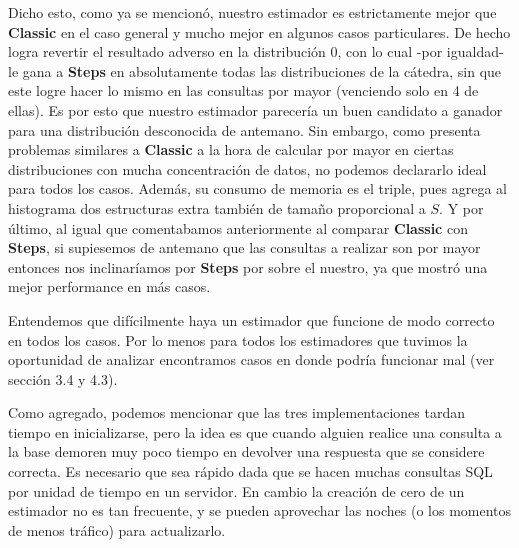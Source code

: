 Dicho esto, como ya se mencionó, nuestro estimador es estrictamente mejor que \textbf{Classic} en el caso general y mucho mejor en algunos casos particulares. De hecho logra revertir el resultado adverso en la distribución 0, con lo cual -por igualdad- le gana a \textbf{Steps} en absolutamente todas las distribuciones de la cátedra, sin que este logre hacer lo mismo en las consultas por mayor (venciendo solo en 4 de ellas). Es por esto que nuestro estimador parecería un buen candidato a ganador para una distribución desconocida de antemano. Sin embargo, como presenta problemas similares a \textbf{Classic} a la hora de calcular por mayor en ciertas distribuciones con mucha concentración de datos, no podemos declararlo ideal para todos los casos. Además, su consumo de memoria es el triple, pues agrega al histograma dos estructuras extra también de tamaño proporcional a $S$. Y por último, al igual que comentabamos anteriormente al comparar \textbf{Classic} con \textbf{Steps}, si supiesemos de antemano que las consultas a realizar son por mayor entonces nos inclinaríamos por \textbf{Steps} por sobre el nuestro, ya que mostró una mejor performance en más casos.

Entendemos que difícilmente haya un estimador que funcione de modo correcto en todos los casos. Por lo menos para todos los estimadores que tuvimos la oportunidad de analizar encontramos casos en donde podría funcionar mal (ver sección 3.4 y 4.3).

Como agregado, podemos mencionar que las tres implementaciones tardan tiempo en inicializarse, pero la idea es que cuando alguien realice una consulta a la base demoren muy poco tiempo en devolver una respuesta que se considere correcta. Es necesario que sea rápido dada que se hacen muchas consultas SQL por unidad de tiempo en un servidor. En cambio la creación de cero de un estimador no es tan frecuente, y se pueden aprovechar las noches (o los momentos de menos tráfico) para actualizarlo. 

